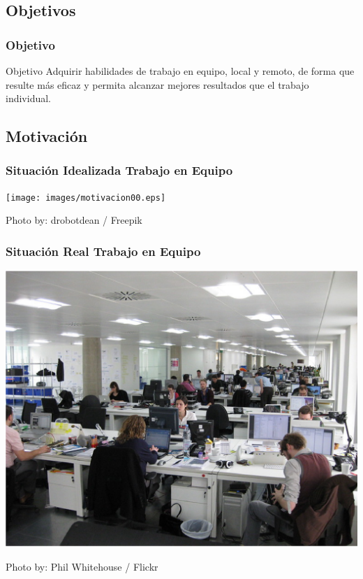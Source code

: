 \documentclass[handout,a4paper,t,xcolor=pst,dvips]{beamer}
\begin{document}
\subsection{Objetivos}

\begin{frame}[c]
	\frametitle{Objetivo}
	\begin{block}{Objetivo}
		Adquirir habilidades de trabajo en equipo, local y remoto, de forma que resulte más eficaz y permita alcanzar mejores resultados que el trabajo individual.
	\end{block}
\end{frame}

\subsection{Motivación}

\begin{frame}[c]
	\frametitle{Situación Idealizada Trabajo en Equipo}
	\begin{center}
		\texttt{[image: images/motivacion00.eps]}
	\end{center}
	\begin{flushright}
		\tiny{Photo by: drobotdean / Freepik}
	\end{flushright}

\end{frame}

\begin{frame}[c]
	\frametitle{Situación Real Trabajo en Equipo}
	\begin{center}
		\includegraphics[width=0.73\linewidth,keepaspectratio=true]{images/motivacion01.eps}
	\end{center}
	\begin{flushright}
		\tiny{Photo by: Phil Whitehouse / Flickr}
	\end{flushright}
\end{frame}
\end{document}
